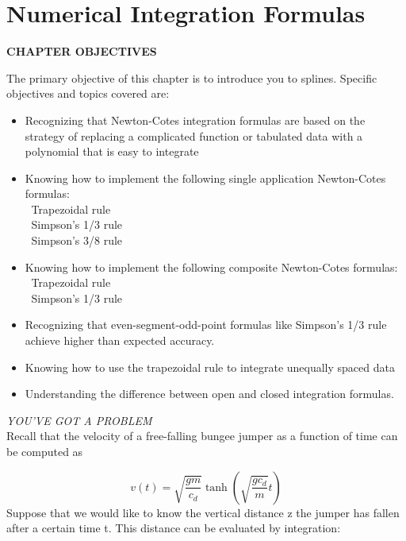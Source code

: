 \documentclass[../main.tex]{subfiles}
\begin{document}
\chapter{Numerical Integration Formulas}\label{chap:chap19}

\begin{center}
    \Large{\textbf{CHAPTER OBJECTIVES}}
\end{center}
The primary objective of this chapter is to introduce you to splines. Specific objectives
and topics covered are:

\begin{itemize}
    \item Recognizing that Newton-Cotes integration formulas are based on the strategy of
	replacing a complicated function or tabulated data with a polynomial that is easy
	to integrate
	\item Knowing how to implement the following single application Newton-Cotes
	formulas:\\
	$\>$ Trapezoidal rule\\
	$\>$ Simpson's 1/3 rule\\
	$\>$ Simpson's 3/8 rule
    \item Knowing how to implement the following composite Newton-Cotes formulas:
	\\$\>$ Trapezoidal rule\\
	$\>$ Simpson's 1/3 rule
    \item Recognizing that even-segment-odd-point formulas like Simpson's 1/3 rule
	achieve higher than expected accuracy.
    \item Knowing how to use the trapezoidal rule to integrate unequally spaced data
    \item Understanding the difference between open and closed integration formulas.
\end{itemize}
\vspace{2cm}

\noindent\textit{YOU'VE GOT A PROBLEM}\\
Recall that the velocity of a free-falling bungee jumper as a function of time can be
computed as

\begin{equation}
	\tag{19.1}
	v(t)=\sqrt{\frac{g m}{c_{d}}} \tanh \left(\sqrt{\frac{g c_{d}}{m}} t\right)
	\end{equation}
	Suppose that we would like to know the vertical distance z the jumper has fallen after a
	certain time t. This distance can be evaluated by integration:
\end{document}
